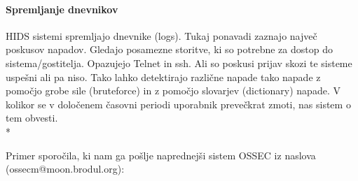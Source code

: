 \documentclass[12pt]{article}
\begin{document}


\paragraph{Spremljanje dnevnikov} %

HIDS sistemi spremljajo dnevnike (logs). Tukaj ponavadi zaznajo največ poskusov napadov.
Gledajo posamezne storitve, ki so potrebne za dostop do sistema/gostitelja.
Opazujejo Telnet in ssh.
Ali so poskusi prijav skozi te sisteme uspešni ali pa niso.
Tako lahko detektirajo različne napade tako napade z pomočjo grobe sile (bruteforce) in z pomočjo slovarjev (dictionary) napade.
V kolikor se v določenem časovni periodi uporabnik prevečkrat zmoti, nas sistem o tem obvesti.
\\*

Primer sporočila, ki nam ga pošlje naprednejši sistem OSSEC iz naslova (ossecm@moon.brodul.org):
\end{document}

